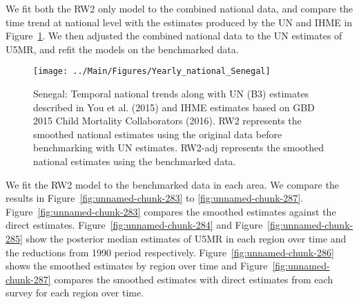 \documentclass[12pt]{article}\usepackage[]{graphicx}\usepackage[]{color}
\newenvironment{knitrout}{}{} %
\begin{document}
We fit both the RW2 only model to the combined national data, and compare the time trend at national level with the estimates produced by the UN and IHME in Figure~\ref{fig:unnamed-chunk-282}. We then adjusted the combined national data to the UN estimates of U5MR, and refit the models on the benchmarked data. 

\begin{knitrout}
\color{fgcolor}\begin{figure}[bht]

{\centering \texttt{[image: ../Main/Figures/Yearly\_national\_Senegal]} 

}

\caption[Senegal]{Senegal: Temporal national trends along with UN (B3) estimates described in You et al. (2015) and IHME estimates based on GBD 2015 Child Mortality Collaborators (2016). RW2 represents the smoothed national estimates using the original data before benchmarking with UN estimates. RW2-adj represents the smoothed national estimates using the benchmarked data.}\label{fig:unnamed-chunk-282}
\end{figure}


\end{knitrout}
 

We fit the RW2 model to the benchmarked data in each area. 
We compare the results in Figure~\ref{fig:unnamed-chunk-283} to \ref{fig:unnamed-chunk-287}.
Figure~\ref{fig:unnamed-chunk-283} compares the smoothed estimates against the direct estimates. Figure~\ref{fig:unnamed-chunk-284} and Figure~\ref{fig:unnamed-chunk-285} show the posterior median estimates of U5MR in each region over time and the reductions from 1990 period respectively.
Figure~\ref{fig:unnamed-chunk-286} shows the smoothed estimates by region over time and Figure~\ref{fig:unnamed-chunk-287} compares the smoothed estimates with direct estimates from each survey for each region over time.




\end{document}
